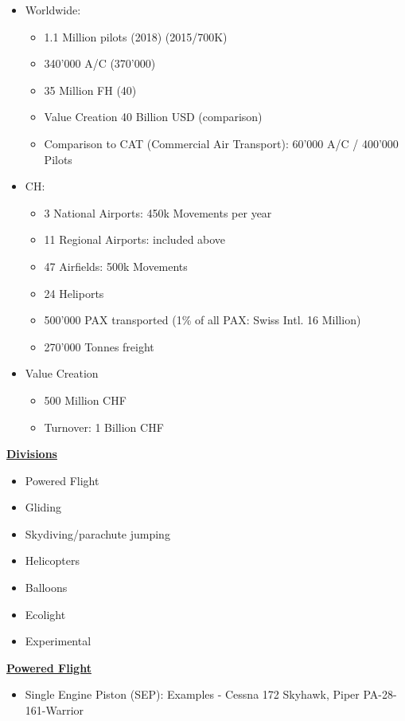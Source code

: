 \documentclass[9pt, landscape, fleqn]{scrartcl}
\begin{document}
\begin{multicols*}{3}
\begin{itemize}
    \item Worldwide:
    \begin{itemize}
        \item 1.1 Million pilots (2018) (2015/700K)
        \item 340'000 A/C (370'000)
        \item 35 Million FH (40)
        \item Value Creation 40 Billion USD (comparison)
        \item Comparison to CAT (Commercial Air Transport): 60'000 A/C / 400'000 Pilots
    \end{itemize}
    \item CH:
    \begin{itemize}
        \item 3 National Airports: 450k Movements per year 
        \item 11 Regional Airports: included above
        \item 47 Airfields: 500k Movements 
        \item 24 Heliports
        \item 500'000 PAX transported (1\% of all PAX: Swiss Intl. 16 Million)
        \item 270'000 Tonnes freight 
    \end{itemize}
    \item Value Creation 
    \begin{itemize}
        \item 500 Million CHF
        \item Turnover: 1 Billion CHF
    \end{itemize}
\end{itemize}
\underline{\textbf{Divisions}}
\begin{itemize}
    \item Powered Flight 
    \item Gliding 
    \item Skydiving/parachute jumping  
    \item Helicopters
    \item Balloons 
    \item Ecolight
    \item Experimental
\end{itemize}
\underline{\textbf{Powered Flight}}
\begin{itemize}
    \item Single Engine Piston (SEP): Examples - Cessna 172 Skyhawk, Piper PA-28-161-Warrior

\end{itemize}
\end{multicols*}
\end{document}
